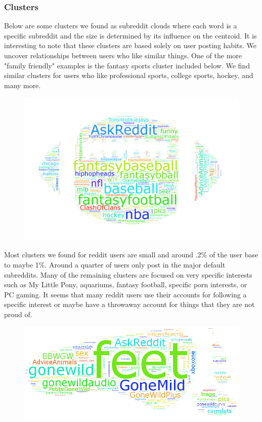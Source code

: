 \documentclass[12pt]{article}
\numberwithin{equation}{section}
\begin{document}
\subsubsection*{Clusters}
Below are some clusters we found as subreddit clouds where each word is a specific subreddit and the size is determined by its influence on the centroid.  It is interesting to note that these clusters are based solely on user posting habits.  We uncover relationships between users who like similar things.  One of the more "family friendly" examples is the fantasy sports cluster included below.  We find similar clusters for users who like professional sports, college sports, hockey, and many more. 
  
\begin{figure}[h!]
\centering
	\includegraphics[scale=.2]{football_95.png}
\end{figure}

Most clusters we found for reddit users are small and around .2\% of
 the user base to maybe 1\%. Around a quarter of users only 
 post in the major default subreddits. Many of the remaining clusters 
 are focused on very specific interests such as My Little Pony, 
 aquariums, fantasy football, specific porn interests, or PC gaming. 
 It seems that many reddit users use their accounts for following a 
 specific interest or maybe have a throwaway account for things
 that they are not proud of. 
\begin{figure}[h!]
	\centering
	\includegraphics[scale=.4]{feet_16.png}
\end{figure}
\end{document}
